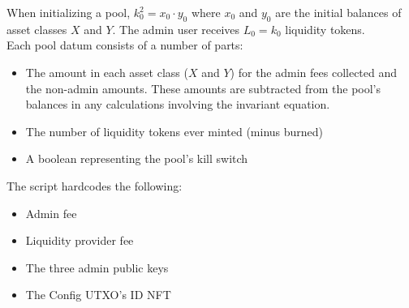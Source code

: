 \documentclass{article}
\begin{document}
When initializing a pool, $k_0^2 = x_0 \cdot y_0$ where $x_0$ and $y_0$ are the
initial balances of asset classes $X$ and $Y$. The admin user receives $L_0 =
k_0$ liquidity tokens. \\

Each pool datum consists of a number of parts:
\begin{itemize}
  \item The amount in each asset class ($X$ and $Y$) for the admin fees
    collected and the non-admin amounts.
    These amounts are subtracted from the pool's balances in any calculations
    involving the invariant equation.
  \item The number of liquidity tokens ever minted (minus burned)
  \item A boolean representing the pool's kill switch
\end{itemize}

The script hardcodes the following:
\begin{itemize}
  \item Admin fee
  \item Liquidity provider fee
  \item The three admin public keys
  \item The Config UTXO's ID NFT
\end{itemize}
\end{document}
